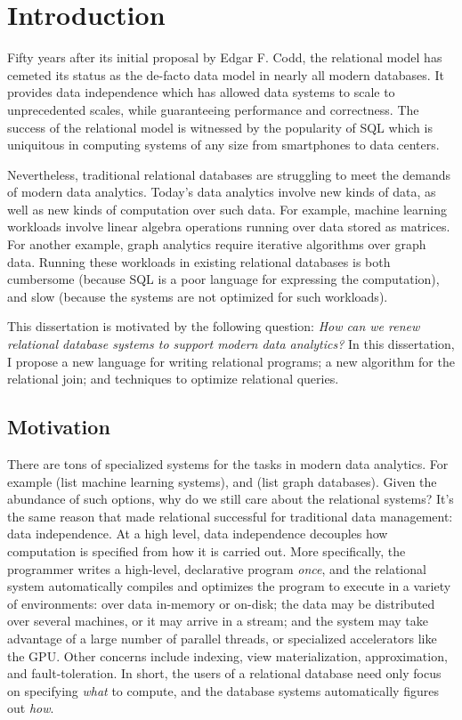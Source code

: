 \chapter{Introduction}
\label{sec:intro}

Fifty years after its initial proposal by Edgar F. Codd,
 the relational model has cemeted its status as the de-facto data model 
 in nearly all modern databases.
It provides data independence 
 which has allowed data systems to scale to unprecedented scales,
 while guaranteeing performance and correctness.
The success of the relational model is witnessed 
 by the popularity of SQL 
 which is uniquitous in computing systems 
 of any size from smartphones to data centers.

 Nevertheless, traditional relational databases are struggling 
  to meet the demands of modern data analytics.
Today's data analytics involve new kinds of data, 
 as well as new kinds of computation over such data. 
For example, machine learning workloads involve linear algebra operations
 running over data stored as matrices. 
For another example, graph analytics require iterative algorithms
 over graph data.
Running these workloads in existing relational databases 
 is both cumbersome 
 (because SQL is a poor language for expressing the computation),
 and slow (because the systems are not optimized for such workloads).

This dissertation is motivated by the following question: 
{\em How can we renew relational database systems 
 to support modern data analytics?}
In this dissertation, I propose a new language 
 for writing relational programs;
 a new algorithm for the relational join;
 and techniques to optimize relational queries. 

\section{Motivation}
\label{sec:intro:motivation}

There are tons of specialized systems for the tasks 
 in modern data analytics.
For example (list machine learning systems), and (list graph databases).
Given the abundance of such options,
 why do we still care about the relational systems?
It's the same reason that made relational successful 
 for traditional data management: data independence.
At a high level, data independence decouples
 how computation is specified from how it is carried out. 
More specifically, the programmer writes a high-level,
 declarative program {\em once},
 and the relational system automatically 
 compiles and optimizes the program to execute 
 in a variety of environments:
 over data in-memory or on-disk;
 the data may be distributed over several machines,
 or it may arrive in a stream;
 and the system may take advantage of a large number of parallel threads,
 or specialized accelerators like the GPU.
Other concerns include indexing, view materialization,
 approximation, and fault-toleration.
In short, the users of a relational database need only focus on
 specifying {\em what} to compute, 
 and the database systems automatically figures out {\em how}. 

